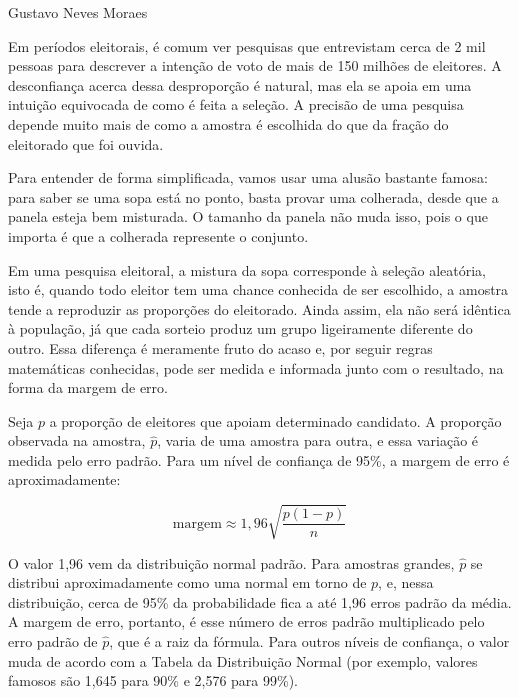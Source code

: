 {Gustavo Neves Moraes}
{

\hspace*{1.5em}
Em períodos eleitorais, é comum ver pesquisas que entrevistam cerca de 2 mil pessoas
para descrever a intenção de voto de mais de 150 milhões de eleitores.
A desconfiança acerca dessa desproporção é natural,
mas ela se apoia em uma intuição equivocada de como é feita a seleção.
A precisão de uma pesquisa depende muito mais de como a amostra é escolhida
do que da fração do eleitorado que foi ouvida.

\subtitle{Por que uma amostra pequena pode bastar}

\hspace*{1.5em}
Para entender de forma simplificada, vamos usar uma alusão bastante famosa: 
para saber se uma sopa está no ponto, basta provar uma colherada, desde que a panela esteja bem misturada.
O tamanho da panela não muda isso,
pois o que importa é que a colherada represente o conjunto.

\hspace*{1.5em}
Em uma pesquisa eleitoral, a mistura da sopa corresponde à seleção aleatória, isto é,
quando todo eleitor tem uma chance conhecida de ser escolhido,
a amostra tende a reproduzir as proporções do eleitorado.
Ainda assim, ela não será idêntica à população,
já que cada sorteio produz um grupo ligeiramente diferente do outro.
Essa diferença é meramente fruto do acaso e, por seguir regras matemáticas conhecidas,
pode ser medida e informada junto com o resultado, na forma da margem de erro.

\subtitle{Quanto a amostra pode errar}

\hspace*{1.5em}
Seja $p$ a proporção de eleitores que apoiam determinado candidato.
A proporção observada na amostra, $\hat{p}$, varia de uma amostra para outra,
e essa variação é medida pelo erro padrão.
Para um nível de confiança de 95\%, a margem de erro é aproximadamente:

\[
\text{margem} \approx 1{,}96 \sqrt{\frac{p(1-p)}{n}}
\]

\hspace*{1.5em}
O valor 1,96 vem da distribuição normal padrão.
Para amostras grandes, $\hat{p}$ se distribui aproximadamente como uma normal em torno de $p$,
e, nessa distribuição, cerca de 95\% da probabilidade fica a até 1,96 erros padrão da média.
A margem de erro, portanto, é esse número de erros padrão
multiplicado pelo erro padrão de $\hat{p}$, que é a raiz da fórmula.
Para outros níveis de confiança, o valor muda de acordo com a Tabela da Distribuição Normal (por
exemplo, valores famosos são 1,645 para 90\% e 2,576 para 99\%).

}
